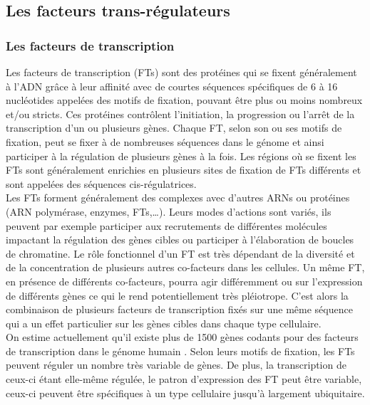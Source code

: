 \subsection{Les facteurs \gls{trans}-régulateurs}
\label{subsec:elem-trans}

\subsubsection{Les facteurs de transcription}
\label{subsubsec:facteur-trans}

Les facteurs de transcription (\acrshort{FT}s) sont des protéines qui se fixent généralement à l’ADN grâce à leur affinité avec de courtes séquences spécifiques de 6 à 16 nucléotides appelées des motifs de fixation, pouvant être plus ou moins nombreux et/ou stricts. Ces protéines contrôlent l’initiation, la progression ou l’arrêt  de la transcription d’un ou plusieurs gènes. Chaque \acrshort{FT}, selon son ou ses motifs de fixation, peut se fixer à de nombreuses séquences dans le génome et ainsi participer à la régulation de plusieurs gènes à la fois. Les régions où se fixent les \acrshort{FT}s sont généralement enrichies en plusieurs sites de fixation de \acrshort{FT}s différents et sont appelées des séquences \gls{cis}-régulatrices.\\

Les \acrshort{FT}s forment généralement des complexes avec d’autres \acrshort{ARN}s ou protéines (ARN polymérase, enzymes, \acrshort{FT}s,…). Leurs modes d’actions sont variés, ils peuvent par exemple participer aux recrutements de différentes molécules impactant la régulation des gènes cibles ou participer à l’élaboration de boucles de chromatine. Le rôle fonctionnel d’un \acrshort{FT} est très dépendant de la diversité et de la concentration de plusieurs autres co-facteurs dans les cellules. Un même \acrshort{FT}, en présence de différents co-facteurs, pourra agir différemment ou sur l’expression de différents gènes ce qui le rend potentiellement très pléiotrope. C’est alors la combinaison de plusieurs facteurs de transcription fixés sur une même séquence qui a un effet particulier sur les gènes cibles dans chaque type cellulaire. \\

On estime actuellement qu’il existe plus de 1500 gènes codants pour des facteurs de transcription dans le génome humain \citep{wingender_tfclass_2018}. Selon leurs motifs de fixation, les \acrshort{FT}s peuvent réguler un nombre très variable de gènes. De plus, la transcription de ceux-ci étant elle-même régulée, le patron d’expression des \acrshort{FT} peut être variable, ceux-ci peuvent être spécifiques à un type cellulaire jusqu'à largement ubiquitaire.

